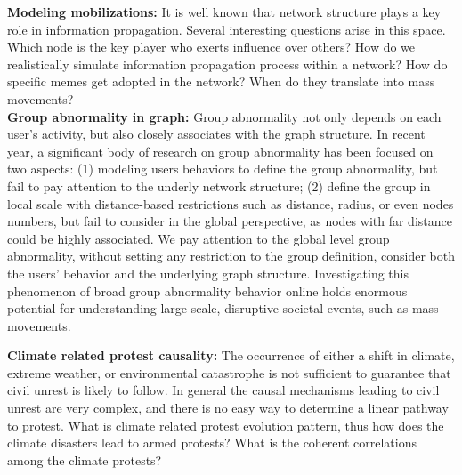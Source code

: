 \noindent
{\bf Modeling mobilizations:}
It is well known that network structure plays a key role in information propagation.
Several interesting questions arise in this space. Which node is the key player who exerts influence over others? How do we realistically simulate information propagation process within a network?
How do specific memes get adopted in the network? When do they translate into mass movements?\\

\noindent
{\bf Group abnormality in graph:}
Group abnormality not only depends on each user's activity, but also closely associates with the graph structure. In recent year, a significant body of research on group abnormality has been focused on two aspects: (1) modeling users behaviors to define the group abnormality, but fail to pay attention to the underly network structure; (2) define the group in local scale with distance-based restrictions such as distance, radius, or even nodes numbers, but fail to consider in the global perspective, as nodes with far distance could be highly associated. We pay attention to the global level group abnormality,  without setting any restriction to the group definition, consider both the users' behavior and the underlying graph structure. Investigating this phenomenon of broad group abnormality behavior online holds enormous potential for understanding large-scale, disruptive societal events, such as mass movements.


\noindent
{\bf Climate related protest causality:}
The occurrence of either a shift in climate, extreme weather, or environmental catastrophe is not sufficient to guarantee that civil unrest is likely to follow. In general the causal mechanisms leading to civil unrest are very complex, and there is no easy way to determine a linear pathway to
protest. What is climate related protest evolution pattern, thus how does the climate disasters lead to armed protests? What is the coherent correlations among the climate protests? 


